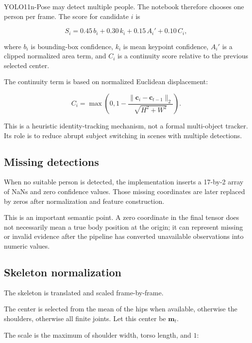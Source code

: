\documentclass[11pt,a4paper]{article}
\begin{document}
YOLO11n-Pose may detect multiple people. The notebook therefore chooses one person per frame. The score for candidate $i$ is

\begin{equation}
S_i
=
0.45\,b_i
+
0.30\,k_i
+
0.15\,A_i'
+
0.10\,C_i,
\end{equation}

where $b_i$ is bounding-box confidence, $k_i$ is mean keypoint confidence, $A_i'$ is a clipped normalized area term, and $C_i$ is a continuity score relative to the previous selected center.

The continuity term is based on normalized Euclidean displacement:

\begin{equation}
C_i
=
\max
\left(
0,
1-
\frac{
\lVert \mathbf{c}_i-\mathbf{c}_{t-1}\rVert_2
}{
\sqrt{H^2+W^2}
}
\right).
\end{equation}

This is a heuristic identity-tracking mechanism, not a formal multi-object tracker. Its role is to reduce abrupt subject switching in scenes with multiple detections.

\subsection{Missing detections}

When no suitable person is detected, the implementation inserts a 17-by-2 array of NaNs and zero confidence values. Those missing coordinates are later replaced by zeros after normalization and feature construction.

This is an important semantic point. A zero coordinate in the final tensor does not necessarily mean a true body position at the origin; it can represent missing or invalid evidence after the pipeline has converted unavailable observations into numeric values.

\subsection{Skeleton normalization}

The skeleton is translated and scaled frame-by-frame.

The center is selected from the mean of the hips when available, otherwise the shoulders, otherwise all finite joints. Let this center be $\mathbf{m}_t$.

The scale is the maximum of shoulder width, torso length, and $1$:
\end{document}
